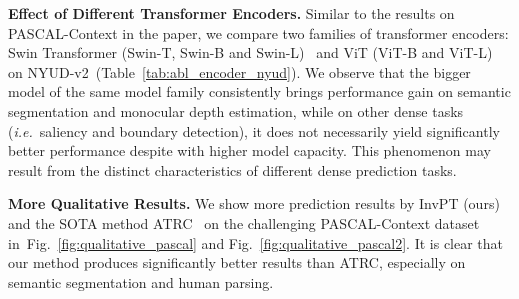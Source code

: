 \documentclass[runningheads]{llncs}
\newcommand*{\ie}{\emph{i.e.}}
\begin{document}
\par\noindent\textbf{Effect of Different Transformer Encoders.} Similar to the results on PASCAL-Context in the paper, we compare two families of transformer encoders: Swin Transformer (Swin-T, Swin-B and Swin-L)~\cite{swin} and ViT (ViT-B and ViT-L)~\cite{vit} on NYUD-v2~(Table~\ref{tab:abl_encoder_nyud}).
We observe that the bigger model of the same model family consistently brings performance gain on semantic segmentation and monocular depth estimation, while on other dense tasks (\ie~saliency and boundary detection), it does not necessarily yield significantly better performance despite with higher model capacity. This phenomenon may result from the distinct characteristics of different dense prediction tasks.


\begin{table}[t]
\centering
\caption{Performance comparison of using different transformer
encoder structures in InvPT on NYUD-v2.}
\label{tab:abl_encoder_nyud}
     \vspace{-5pt}
\end{table}


\par\noindent\textbf{More Qualitative Results.}
We show more prediction results by InvPT (ours) and the SOTA method ATRC~\cite{atrc} on the challenging PASCAL-Context dataset in~Fig.~\ref{fig:qualitative_pascal} and Fig.~\ref{fig:qualitative_pascal2}. It is clear that our method produces significantly better results than ATRC, especially on semantic segmentation and human parsing.
\end{document}
